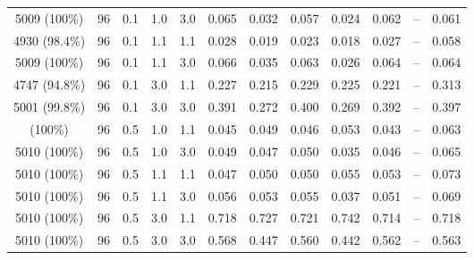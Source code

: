 \begin{longtable}[t]{cccccrrrrrrc}
5009 (100\%) & 96 & 0.1 & 1.0 & 3.0 & 0.065 & 0.032 & 0.057 & 0.024 & 0.062 & -- & 0.061\\
4930 (98.4\%) & 96 & 0.1 & 1.1 & 1.1 & 0.028 & 0.019 & 0.023 & 0.018 & 0.027 & -- & 0.058\\
5009 (100\%) & 96 & 0.1 & 1.1 & 3.0 & 0.066 & 0.035 & 0.063 & 0.026 & 0.064 & -- & 0.064\\
4747 (94.8\%) & 96 & 0.1 & 3.0 & 1.1 & 0.227 & 0.215 & 0.229 & 0.225 & 0.221 & -- & 0.313\\
5001 (99.8\%) & 96 & 0.1 & 3.0 & 3.0 & 0.391 & 0.272 & 0.400 & 0.269 & 0.392 & -- & 0.397\\
\addlinespace
5010 (100\%) & 96 & 0.5 & 1.0 & 1.1 & 0.045 & 0.049 & 0.046 & 0.053 & 0.043 & -- & 0.063\\
5010 (100\%) & 96 & 0.5 & 1.0 & 3.0 & 0.049 & 0.047 & 0.050 & 0.035 & 0.046 & -- & 0.065\\
5010 (100\%) & 96 & 0.5 & 1.1 & 1.1 & 0.047 & 0.050 & 0.050 & 0.055 & 0.053 & -- & 0.073\\
5010 (100\%) & 96 & 0.5 & 1.1 & 3.0 & 0.056 & 0.053 & 0.055 & 0.037 & 0.051 & -- & 0.069\\
5010 (100\%) & 96 & 0.5 & 3.0 & 1.1 & 0.718 & 0.727 & 0.721 & 0.742 & 0.714 & -- & 0.718\\
5010 (100\%) & 96 & 0.5 & 3.0 & 3.0 & 0.568 & 0.447 & 0.560 & 0.442 & 0.562 & -- & 0.563\\
\bottomrule
\end{longtable}
\endgroup{}
